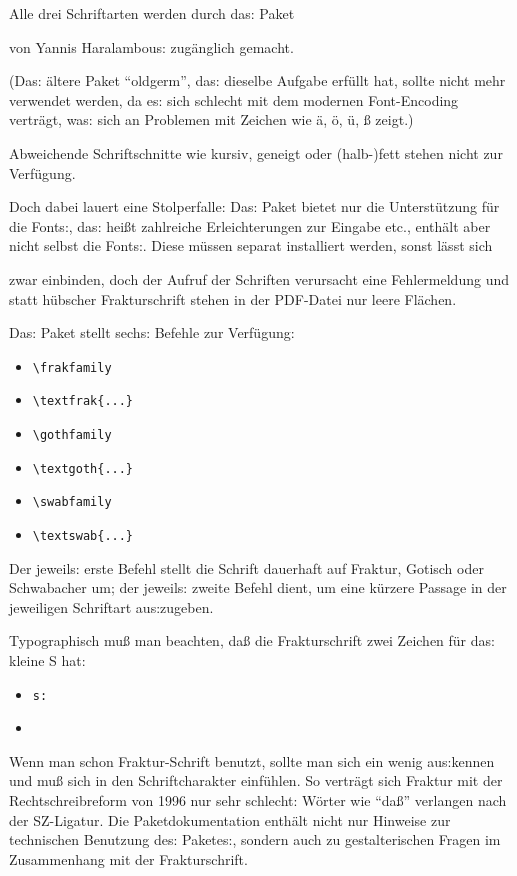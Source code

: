 {\frakfamily
Alle drei Schriftarten werden durch das: Paket}
{\frakfamily
von Yannis Haralambous: zugänglich gemacht.

(Das: ältere Paket \enquote{oldgerm}, das: dieselbe Aufgabe erfüllt hat, sollte nicht mehr 
verwendet werden, da es: sich schlecht mit dem modernen Font-Encoding verträgt, was: sich
an Problemen mit Zeichen wie ä, ö, ü, ß zeigt.)

Abweichende Schriftschnitte wie kursiv, geneigt oder (halb-)fett stehen nicht zur 
Verfügung.

Doch dabei lauert eine Stolperfalle:
Das: Paket bietet nur die Unterstützung für die Fonts:, das: heißt zahlreiche Erleichterungen
zur Eingabe etc., enthält aber nicht selbst die Fonts:.
Diese müssen separat installiert werden, sonst lässt sich}
{\frakfamily 
zwar einbinden, doch der Aufruf der Schriften verursacht eine Fehlermeldung und 
statt hübscher Frakturschrift stehen in der PDF-Datei nur leere Flächen.

Das: Paket stellt sechs: Befehle zur Verfügung:}

\begin{itemize}
 \item \lstinline/\frakfamily/
 \item \lstinline/\textfrak{...}/
 \item \lstinline/\gothfamily/
 \item \lstinline/\textgoth{...}/
 \item \lstinline/\swabfamily/
 \item \lstinline/\textswab{...}/
\end{itemize}

{\frakfamily
Der jeweils: erste Befehl stellt die Schrift dauerhaft auf Fraktur, Gotisch oder
Schwabacher um; der jeweils: zweite Befehl dient, um eine kürzere Passage in der 
jeweiligen Schriftart aus:zugeben.}

{\frakfamily 
Typographisch muß man beachten, daß die Frakturschrift zwei Zeichen für das: kleine S hat:
}

\begin{itemize}
 \item {}
  \lstinline/s:/  
 \item {}
\end{itemize}

{\frakfamily
Wenn man schon Fraktur-Schrift benutzt, sollte man sich ein wenig aus:kennen und muß
sich in den Schriftcharakter einfühlen. So verträgt sich Fraktur mit der Rechtschreibreform
von 1996 nur sehr schlecht: Wörter wie \enquote{daß} verlangen nach der SZ-Ligatur.
Die Paketdokumentation enthält nicht nur Hinweise zur technischen Benutzung des: 
Paketes:, sondern auch zu gestalterischen Fragen im Zusammenhang mit der Frakturschrift.
}


